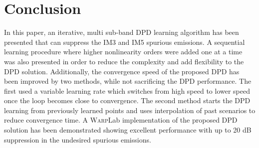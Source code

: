 




\section{Conclusion}
In this paper, an iterative, multi sub-band DPD learning algorithm has been presented that can suppress the IM3 and IM5 spurious emissions. 
A sequential learning procedure where higher nonlinearity orders were added one at a time was also presented in order to reduce the complexity and add flexibility to the DPD solution. 
Additionally, the convergence speed of the proposed DPD has been improved by two methods, while not sacrificing the DPD performance. 
The first used a variable learning rate which switches from high speed to lower speed once the loop becomes close to convergence. 
The second method starts the DPD learning from previously learned points and uses interpolation of past scenarios to reduce convergence time. 
A \textsc{Warp}Lab implementation of the proposed DPD solution has been demonstrated showing excellent performance with up to 20 dB suppression in the undesired spurious emissions.


 

\iffalse %

